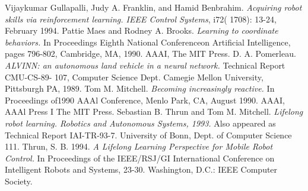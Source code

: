 \documentclass[conference]{IEEEtran}
\begin{document}

%
%
%
\begin{thebibliography}{1}

Vijaykumar Gullapalli,  Judy A. Franklin, and Hamid Benbrahim.  \emph{Acquiring robot skills via reinforcement  learning. IEEE Control Systems}, i72(  1708):  13-24, February  1994. 
Pattie Maes and Rodney A. Brooks.  \emph{Learning to coordinate behaviors.} In Proceedings Eighth National Conferenceon Artificial Intelligence,  pages 796-802, Cambridge, MA, 1990.  AAAI, The MIT Press. 
D.  A. Pomerleau.  \emph{ALVINN: an  autonomous land vehicle  in  a neural network.}  Technical Report CMU-CS-89- 107, Computer Science Dept. Camegie Mellon University, Pittsburgh PA, 1989.
Tom M. Mitchell.  \emph{Becoming  increasingly reactive.}  In Proceedings of1990 AAAl Conference, Menlo Park, CA, August  1990.  AAAI, AAAl Press I The MIT Press. 
Sebastian B. Thrun and Tom M. Mitchell.  \emph{Lifelong robot learning. Robotics and Autonomous Systems, 1993.} Also appeared as Technical Report IAI-TR-93-7.  University of Bonn, Dept.  of Computer Science 111.
Thrun, S. B. 1994. \emph{A Lifelong Learning Perspective for Mobile Robot Control.} In Proceedings of the IEEE/RSJ/GI International Conference on Intelligent Robots and Systems, 23-30. Washington, D.C.: IEEE Computer Society.
\end{thebibliography}




\end{document}
